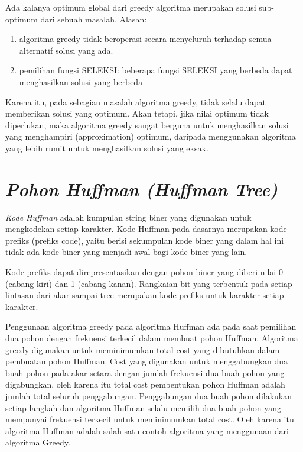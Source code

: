 Ada kalanya optimum global dari greedy algoritma merupakan solusi sub-optimum dari sebuah masalah. Alasan:
\begin{enumerate}
\item algoritma greedy tidak beroperasi secara menyeluruh terhadap semua alternatif solusi yang ada.  
\item	pemilihan fungsi SELEKSI: beberapa fungsi SELEKSI yang berbeda dapat menghasilkan solusi yang berbeda 
\end{enumerate}

Karena itu, pada sebagian masalah algoritma greedy, tidak selalu dapat memberikan solusi yang  optimum. Akan tetapi, jika nilai optimum tidak diperlukan, maka algoritma greedy sangat berguna untuk menghasilkan solusi yang menghampiri (approximation) optimum, daripada menggunakan algoritma yang lebih rumit untuk menghasilkan solusi yang eksak. 

\section{\textit{Pohon Huffman (Huffman Tree)}}

\textit{Kode Huffman} adalah kumpulan string biner yang digunakan untuk mengkodekan setiap karakter. Kode Huffman pada dasarnya merupakan kode prefiks (prefiks code), yaitu berisi sekumpulan kode biner yang dalam hal ini tidak ada kode biner yang menjadi awal bagi kode biner yang lain.

Kode prefiks dapat direpresentasikan dengan pohon biner yang diberi nilai 0 (cabang kiri) dan 1 (cabang kanan). Rangkaian bit yang terbentuk pada setiap lintasan dari akar sampai tree merupakan kode prefiks untuk karakter setiap karakter.

Penggunaan algoritma greedy pada algoritma Huffman ada pada saat pemilihan dua pohon dengan frekuensi terkecil dalam membuat pohon Huffman. Algoritma greedy digunakan untuk meminimumkan total cost yang dibutuhkan dalam pembuatan pohon Huffman. Cost yang digunakan untuk menggabungkan dua buah pohon pada akar setara dengan jumlah frekuensi dua buah pohon yang digabungkan, oleh karena itu total cost pembentukan pohon Huffman adalah jumlah total seluruh penggabungan. Penggabungan dua buah pohon dilakukan setiap langkah dan algoritma Huffman selalu memilih dua buah pohon yang mempunyai frekuensi terkecil untuk meminimumkan total cost. Oleh karena itu algoritma Huffman adalah salah satu contoh algoritma yang menggunaan dari algoritma Greedy.

